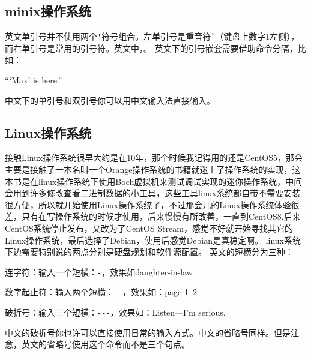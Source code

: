 	\subsection{minix操作系统}
	英文单引号并不使用两个\verb|'|符号组合。左单引号是重音符\verb|`|（键盘上数字1左侧），而右单引号是常用的引号符。英文中，{\color{cyan}{左双引号就是连续两个重音符号}}。
	英文下的引号嵌套需要借助命令分隔，比如：
\begin{codeshow}[listing side text, listing options={escapeinside=++}]%
``\thinspace`Max' is here.''
\end{codeshow}
中文下的单引号和双引号你可以用中文输入法直接输入。

\subsection{Linux操作系统}
	接触Linux操作系统很早大约是在10年，那个时候我记得用的还是CentOS5，那会主要是接触了一本名叫一个Orange操作系统的书籍就迷上了操作系统的实现，这本书是在linux操作系统下使用Boch虚拟机来测试调试实现的迷你操作系统，中间会用到许多修改查看二进制数据的小工具，这些工具linux系统都自带不需要安装很方便，所以就开始使用Linux操作系统了，不过那会儿的Linux操作系统体验很差，只有在写操作系统的时候才使用，后来慢慢有所改善，一直到CentOS8,后来CentOS系统停止发布，又改为了CentOS Stream，感觉不好就开始寻找其它的Linux操作系统，最后选择了Debian，使用后感觉Debian是真稳定啊。
	linux系统下边需要特别说的两点分别是硬盘规划和软件源配置。
英文的短横分为三种：
\begin{feai}
\item 连字符：输入一个短横：\verb|-|，效果如daughter-in-law
\item 数字起止符：输入两个短横：\verb|--|，效果如：page 1--2
\item 破折号：输入三个短横：\verb|---|，效果如：Listen---I'm serious.
\end{feai}

中文的破折号你也许可以直接使用日常的输入方式。中文的省略号同样。但是注意，英文的省略号使用这个命令而不是三个句点。
